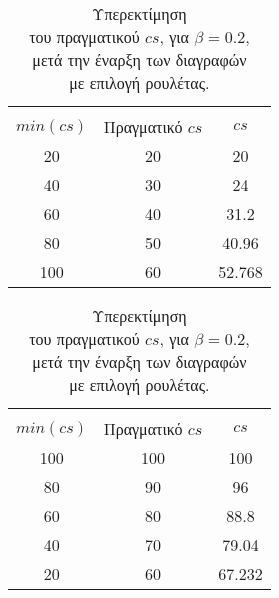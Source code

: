 \begin{table}[!htb]
    \begin{minipage}{.5\linewidth}
    	\centering
      	\caption{Υποεκτίμηση \\του πραγματικού $cs$, για $\beta=0.2$, \\πριν την έναρξη των διαγραφών \\με επιλογή ρουλέτας.}
      	\label{tbl:csUnderestimation}
        \begin{tabular}{cc|c}
            \hline \\ [-1.5ex]
    		$min(cs)$ & Πραγματικό $cs$    & $cs$ 
			\\[1ex] \hline
    		20      &	20	&	20   	\\
    		40    	&	30	& 	24 		\\
    		60    	&	40	& 31.2		\\
    		80     	&	50	& 40.96		\\
    		100     &	60	& 52.768   	\\
			\hline
        \end{tabular}
    \end{minipage}%
    \begin{minipage}{.5\linewidth}
      	\centering
      	\caption{Υπερεκτίμηση \\του πραγματικού $cs$, για $\beta=0.2$, \\μετά την έναρξη των διαγραφών \\με επιλογή ρουλέτας.}
      	\label{tbl:csOverestimation}
        \begin{tabular}{cc|c}
			\hline \\ [-1.5ex]
    		$min(cs)$ & Πραγματικό $cs$    & $cs$ 
			\\[1ex] \hline
   			100     &	100	& 100   	\\
   			80    	&	90	& 96 		\\
    		60    	&	80	& 88.8		\\
    		40     	&	70	& 79.04		\\
    		20      &	60	& 67.232  	\\
			\hline
        \end{tabular}
    \end{minipage} 
\end{table}



